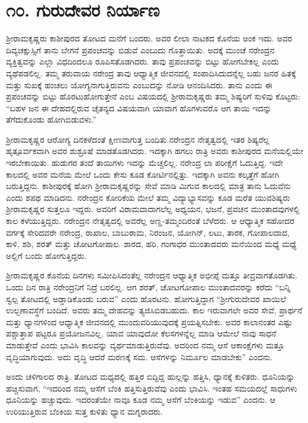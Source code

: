 
\chapter*{೧೦. ಗುರುದೇವರ ನಿರ್ಯಾಣ}

ಶ‍್ರೀರಾಮಕೃಷ್ಣರು ಕಾಶೀಪುರದ ತೋಟದ ಮನೆಗೆ ಬಂದರು. ಅವರ ಲೀಲಾ ನಾಟಕದ ಕೊನೆಯ ಅಂಕ ಇದು. ಅವರ ದಿವ್ಯಚಕ್ಷುಸ್ಸಿಗೆ ತಾನು ಬೇಗನೆ ಪ್ರಪಂಚವನ್ನು ಬಿಡುವೆ ಎಂಬುದು ಗೊತ್ತಾಯಿತು. ಅದಕ್ಕೆ ಮುಂಚೆ ನರೇಂದ್ರನ ವ್ಯಕ್ತಿತ್ವವನ್ನು ಎಲ್ಲಾ ವಿಧದಿಂದಲೂ ರೂಪಿಸತೊಡಗಿದರು. ತಾವು ಪ್ರಪಂಚವನ್ನು ಬಿಟ್ಟು ಹೋಗಬೇಕಲ್ಲ ಎಂದು ವ್ಯಥೆಪಡಲಿಲ್ಲ. ತಮ್ಮ ತರುವಾಯ ನರೇಂದ್ರ ತಾವು ಆಧ್ಯಾತ್ಮಿಕ ಜೀವನದಲ್ಲಿ ಸಂಪಾದಿಸಿದುದನ್ನೆಲ್ಲ ಬಹು ಜನರ ಹಿತಕ್ಕೆ ಮತ್ತು ಸುಖಕ್ಕೆ ಹಂಚಲು ಯೋಗ್ಯನಾಗುತ್ತಿರುವನು ಎಂಬುದನ್ನು ನೋಡಿ ಆನಂದಿಸಿದರು. ತಾನು ಎಂದು ಈ ಪ್ರಪಂಚವನ್ನು ಬಿಟ್ಟು ಹೊರಟುಹೋಗುತ್ತೇನೆ ಎಂಬ ವಿಷಯದಲ್ಲಿ ಶ‍್ರೀರಾಮಕೃಷ್ಣರು ತಮ್ಮ ಶಿಷ್ಯರಿಗೆ ಸುಳಿವು ಕೊಟ್ಟರು: “ಬಹಳ ಜನ ಈ ದೇಹದಲ್ಲಿರುವ ಚೈತನ್ಯದ ವಿಷಯವಾಗಿ ಯಾವಾಗ ಹೊಗಳುವರೊ ಆಗ ತಾಯಿ ಇದನ್ನು ತೆಗೆದುಕೊಂಡು ಹೋಗಿಬಿಡುವಳು.”

ಶ‍್ರೀರಾಮಕೃಷ್ಣರ ಆರೋಗ್ಯ ದಿನಕಳೆದಂತೆ ಕ್ಷೀಣವಾಗುತ್ತ ಬಂದಿತು.ನರೇಂದ್ರನ ನೇತೃತ್ವದಲ್ಲಿ ಇತರ ಶಿಷ್ಯರೆಲ್ಲ ಹೃತ್ಪೂರ್ವಕವಾಗಿ ಅವರ ಶುಶ್ರೂಷೆ ಮಾಡತೊಡಗಿದರು. ಇದಕ್ಕಾಗಿ ಹಗಲು ರಾತ್ರಿ ಅವರು ಕಾಶೀಪುರದ ಮನೆಯಲ್ಲಿಯೇ ಇರಬೇಕಾಯಿತು. ಹುಡುಗರ ತಂದೆ ತಾಯಿಗಳು ಇದನ್ನು ಮೆಚ್ಚಲಿಲ್ಲ. ನರೇಂದ್ರ ಲಾ ಪರೀಕ್ಷೆಗೆ ಓದುತ್ತಿದ್ದ. ಇದೇ ಕಾಲದಲ್ಲಿ ಅವರ ಮನೆಯ ಮೇಲೆ ಒಂದು ಕೇಸು ಕೂಡ ಕೋರ್ಟಿನಲ್ಲಿತ್ತು. ಇದಕ್ಕಾಗಿ ಅವನು ಕಲ್ಕತ್ತೆಗೆ ಹೋಗಿ ಬರುತ್ತಿದ್ದನು. ಕಾಶೀಪುರಕ್ಕೆ ಹೋಗಿ ಶ‍್ರೀರಾಮಕೃಷ್ಣರನ್ನು ಸೇವೆ ಮಾಡಿ ಮಿಗುವ ಕಾಲದಲ್ಲಿ ಮಾತ್ರ ತಾನು ಓದುವೆನು ಎಂದು ಶಪಥ ಮಾಡಿದನು. ನರೇಂದ್ರನ ಕೋರಿಕೆಯ ಮೇಲೆ ತಮ್ಮ ವಿದ್ಯಾಭ್ಯಾಸವನ್ನು ಕೂಡ ಮರೆತ ಯುವಶಿಷ್ಯರು ಶ‍್ರೀರಾಮಕೃಷ್ಣರ ಸುತ್ತಲೂ ಇದ್ದರು. ಅವರಿಗೆ ವಿರಾಮವಾದಾಗಲೆಲ್ಲ ಅಧ್ಯಯನ, ಭಜನೆ, ಪ್ರವಚನ ಮುಂತಾದವುಗಳಲ್ಲಿ ಕಾಲ ಕಳೆಯುತ್ತಿದ್ದರು. ನರೇಂದ್ರನ ನೇತೃತ್ವದಲ್ಲಿ ಅವರೆಲ್ಲ ಅಣ್ಣ-ತಮ್ಮಂದಿರಂತೆ ಬೆಳೆದರು. ಆ ಆಧ್ಯಾತ್ಮಿಕ ಸಹೋದರ ವರ್ಗಕ್ಕೆ ಸೇರಿದವರೇ ನರೇಂದ್ರ, ರಾಖಾಲ, ಬಾಬುರಾಮ, ನಿರಂಜನ, ಯೋಗಿನ್, ಲಟು, ತಾರಕ, ಗೋಪಾಲದಾದ, ಕಾಳಿ, ಶಶಿ, ಶರತ್ ಮತ್ತು ಚೋಟಗೋಪಾಲ. ಶಾರದ, ಹರಿ, ಗಂಗಾಧರ ಮುಂತಾದವರು ಮನೆಯಿಂದ ಮಧ್ಯೆ ಮಧ್ಯೆ ಅಲ್ಲಿಗೆ ಬಂದು ಹೋಗುತ್ತಿದ್ದರು.

ಶ‍್ರೀರಾಮಕೃಷ್ಣರ ಕೊನೆಯ ದಿನಗಳು ಸಮೀಪಿಸಿದಂತೆಲ್ಲ ನರೇಂದ್ರನ ಆಧ್ಯಾತ್ಮಿಕ ಅಭೀಪ್ಸೆ ಮತ್ತೂ ತೀವ್ರವಾಗತೊಡಗಿತು. ಒಂದು ದಿನ ರಾತ್ರಿ ನರೇಂದ್ರನಿಗೆ ನಿದ್ರೆ ಬರಲಿಲ್ಲ. ಆಗ ಶರತ್, ಚೋಟಗೋಪಾಲ ಮುಂತಾದವರನ್ನು ಕರೆದು “ಬನ್ನಿ ಸ್ವಲ್ಪ ತೋಟದಲ್ಲಿ ಅಡ್ಡಾಡಿಕೊಂಡು ಬರುವ” ಎಂದು ಹೊರಟನು. ಹೋಗುತ್ತಿದ್ದಾಗ “ಶ‍್ರೀಗುರುದೇವರ ಖಾಯಿಲೆ ಉಲ್ಬಣಾವಸ್ಥೆಗೆ ಬಂದಿದೆ. ಅವರು ತಮ್ಮ ದೇಹವನ್ನು ತ್ಯಜಿಸಿಬಿಡಬಹುದು. ಕಾಲ ಇರುವಾಗಲೇ ಅವರ ಸೇವೆ, ಪ್ರಾರ್ಥನೆ ಮತ್ತು ಧ್ಯಾನಗಳಿಂದ ಆಧ್ಯಾತ್ಮಿಕ ಜೀವನದಲ್ಲಿ ಮುಂದುವರಿಯುವುದಕ್ಕೆ ಪ್ರಯತ್ನಿಸಬೇಕು. ಅವರ ಕಾಲಾನಂತರ ಎಷ್ಟು ಪಶ್ಚಾತ್ತಾಪ ಪಟ್ಟರೂ ಪ್ರಯೋಜನವಿಲ್ಲ. ಯಾವ ಯಾವುದೋ ಕೆಲಸಗಳನ್ನೆಲ್ಲ ಮಾಡಿ ಆಮೇಲೆ ನಾವು ಸಾಧನೆ ಮಾಡುತ್ತೇವೆ ಎಂದು ಭಾವಿಸಿ ಕಾಲವನ್ನು ವ್ಯರ್ಥಮಾಡುತ್ತಿರುವೆವು. ಅದರಿಂದ ನಮ್ಮ ಆಸೆ ಆಕಾಂಕ್ಷೆಗಳು ಮತ್ತೂ ವೃದ್ಧಿಯಾಗುವುದು. ಅದು ವೃದ್ಧಿ ಆದರೆ ಮರಣಕ್ಕೆ ಸಮ. ಆಸೆಗಳನ್ನು ನಿರ್ಮೂಲ ಮಾಡಬೇಕು” ಎಂದನು.

ಅಂದು ಚಳಿಗಾಲದ ರಾತ್ರಿ. ತೋಟದ ಮಧ್ಯದಲ್ಲಿ ಹತ್ತಿರ ಬಿದ್ದಿದ್ದ ಹುಲ್ಲನ್ನು ಹತ್ತಿಸಿ, ಧ್ಯಾನಕ್ಕೆ ಕುಳಿತರು. ಧೂನಿಯನ್ನು ಹಚ್ಚಿಸುವಾಗ, “ಇದರಿಂದ ನಮ್ಮ ಆಸೆಗೆ ಬೆಂಕಿ ಹತ್ತಿಸುತ್ತಿರುವೆವು ಎಂದು ಭಾವಿಸಿ. ಇಂತಹ ಸಮಯದಲ್ಲೆ ಸಾಧುಗಳು ಧೂನಿಯನ್ನು ಹಚ್ಚುವುದು. ಇದರಂತೆಯೇ ನಾವೂ ಕೂಡ ನಮ್ಮ ಆಸೆಗೆ ಬೆಂಕಿಯನ್ನು ಇಡುವ” ಎಂದನು. ಆ ಉರಿಯುತ್ತಿರುವ ಬೆಂಕಿಯ ಸುತ್ತ ಕುಳಿತು ಧ್ಯಾನ ಮಗ್ನರಾದರು.

